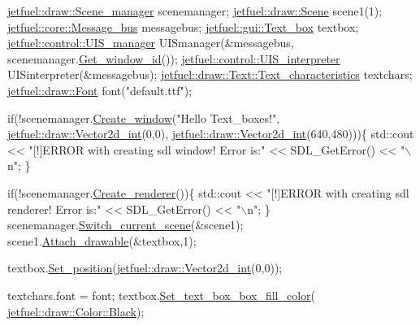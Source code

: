 \begin{DoxyCode}
\hyperlink{classjetfuel_1_1draw_1_1Scene__manager}{jetfuel::draw::Scene\_manager} scenemanager;
\hyperlink{classjetfuel_1_1draw_1_1Scene}{jetfuel::draw::Scene} scene1(1);
\hyperlink{classjetfuel_1_1core_1_1Message__bus}{jetfuel::core::Message\_bus} messagebus;
\hyperlink{classjetfuel_1_1gui_1_1Text__box}{jetfuel::gui::Text\_box} textbox;
\hyperlink{classjetfuel_1_1control_1_1UIS__manager}{jetfuel::control::UIS\_manager} UISmanager(&messagebus,
                                      scenemanager.\hyperlink{classjetfuel_1_1draw_1_1Scene__manager_a1758a86d40dcfaface8958fcd33676bf}{Get\_window\_id}());
\hyperlink{classjetfuel_1_1control_1_1UIS__interpreter}{jetfuel::control::UIS\_interpreter} UISinterpreter(&messagebus);
\hyperlink{structjetfuel_1_1draw_1_1Text_1_1Text__characteristics}{jetfuel::draw::Text::Text\_characteristics} textchars;
\hyperlink{classjetfuel_1_1draw_1_1Font}{jetfuel::draw::Font} font(\textcolor{stringliteral}{"default.ttf"});

\textcolor{keywordflow}{if}(!scenemanager.\hyperlink{classjetfuel_1_1draw_1_1Scene__manager_a5113e9062c272a22d383ba872417ba31}{Create\_window}(\textcolor{stringliteral}{"Hello Text\_boxes!"},
                               \hyperlink{classjetfuel_1_1draw_1_1Vector2d}{jetfuel::draw::Vector2d\_int}(0,0),
                              \hyperlink{classjetfuel_1_1draw_1_1Vector2d}{jetfuel::draw::Vector2d\_int}(640,480)))\{
    std::cout << \textcolor{stringliteral}{"[!]ERROR with creating sdl window! Error is:"}
      << SDL\_GetError() << \textcolor{stringliteral}{"\(\backslash\)n"};
\}

\textcolor{keywordflow}{if}(!scenemanager.\hyperlink{classjetfuel_1_1draw_1_1Scene__manager_afafecd926ce5e4b2543a6d583a7d24b6}{Create\_renderer}())\{
   std::cout << \textcolor{stringliteral}{"[!]ERROR with creating sdl renderer! Error is:"}
        << SDL\_GetError() << \textcolor{stringliteral}{"\(\backslash\)n"};
\}
scenemanager.\hyperlink{classjetfuel_1_1draw_1_1Scene__manager_a770c163b88ba8427539ee182315ea989}{Switch\_current\_scene}(&scene1);
scene1.\hyperlink{classjetfuel_1_1draw_1_1Scene_aea4b4c4ae25c30d661be4c52787e0ea3}{Attach\_drawable}(&textbox,1);

textbox.\hyperlink{classjetfuel_1_1gui_1_1Text__box_a86476b518f2aa3ea4d00ac67f2b03703}{Set\_position}(\hyperlink{classjetfuel_1_1draw_1_1Vector2d}{jetfuel::draw::Vector2d\_int}(0,0));

textchars.font = font;
textbox.\hyperlink{classjetfuel_1_1gui_1_1Text__box_aca9d68ecbd6dc071c17eaa98d844ffc2}{Set\_text\_box\_box\_fill\_color}(
      \hyperlink{classjetfuel_1_1draw_1_1Color_af7ba2fe7adb5154cde6f5563c5582988}{jetfuel::draw::Color::Black});


\end{DoxyCode}
